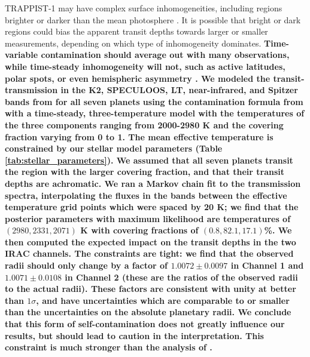 \documentclass[twocolumn]{aastex63}
\begin{document}
TRAPPIST-1 may have complex surface inhomogeneities, including regions brighter or darker than the mean photosphere  \textbf{\citep{Morris2018d,Zhang2018,Wakeford2019}}. It is possible that bright or dark regions could bias the apparent transit depths towards larger or smaller measurements, depending on which type of inhomogeneity dominates. 
\textbf{Time-variable contamination should average out with many observations, while 
time-steady inhomogeneity will not, such as active latitudes, polar spots, or even
hemispheric asymmetry \citep{Yadav2015,Brown2020}.  We modeled the transit-transmission 
in the K2, SPECULOOS, LT, near-infrared, and Spitzer bands from \citet{Ducrot2020} for all
seven planets using the contamination formula from \citet{Rackham2018} with a time-steady, 
three-temperature model with the temperatures of the three components ranging from 2000-2980 K 
and the covering fraction varying from 0 to 1.  The mean effective temperature is constrained 
by our stellar model parameters (Table \ref{tab:stellar_parameters}). We assumed that all seven 
planets transit the region with the larger covering fraction, and that their transit depths are
achromatic.  We ran a Markov chain fit to the transmission spectra, interpolating the fluxes in 
the bands between the effective temperature grid points which were spaced by 20 K; we find
that the posterior parameters with maximum likelihood are temperatures of $(2980,2331,2071)$ K 
with covering fractions of  $(0.8,82.1,17.1)$\%.  We then computed 
the expected impact on the transit depths in the two IRAC channels.  The constraints are tight: we 
find that the observed radii should only change by a factor of $1.0072{\pm}0.0097$ in Channel 1 
and $1.0071{\pm}0.0108$ in Channel 2 (these are the ratios of the observed radii to the actual
radii).  These factors are consistent with unity at better than $1\sigma$, and have uncertainties 
which are comparable to or smaller than the uncertainties on the absolute planetary radii. We 
conclude that this form of self-contamination does not greatly influence our results, but should 
lead to caution in the interpretation.  This constraint is much stronger than the analysis of 
\citet{Morris2018c}.}
\end{document}
